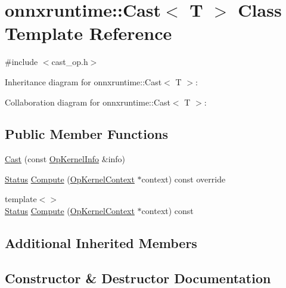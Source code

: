\hypertarget{classonnxruntime_1_1Cast}{}\section{onnxruntime\+:\+:Cast$<$ T $>$ Class Template Reference}
\label{classonnxruntime_1_1Cast}


{\ttfamily \#include $<$cast\+\_\+op.\+h$>$}



Inheritance diagram for onnxruntime\+:\+:Cast$<$ T $>$\+:


Collaboration diagram for onnxruntime\+:\+:Cast$<$ T $>$\+:
\subsection*{Public Member Functions}
\begin{DoxyCompactItemize}
\item 
\mbox{\hyperlink{classonnxruntime_1_1Cast_a47f2ac0d04a75fa194c39e4d3f8005bf}{Cast}} (const \mbox{\hyperlink{classonnxruntime_1_1OpKernelInfo}{Op\+Kernel\+Info}} \&info)
\item 
\mbox{\hyperlink{classonnxruntime_1_1common_1_1Status}{Status}} \mbox{\hyperlink{classonnxruntime_1_1Cast_ad1a2f4201ddd8dc51b8aebbb2b9fb5eb}{Compute}} (\mbox{\hyperlink{classonnxruntime_1_1OpKernelContext}{Op\+Kernel\+Context}} $\ast$context) const override
\item 
{\footnotesize template$<$$>$ }\\\mbox{\hyperlink{classonnxruntime_1_1common_1_1Status}{Status}} \mbox{\hyperlink{classonnxruntime_1_1Cast_a572f4254b2fbd63f83c27f15b8f99e50}{Compute}} (\mbox{\hyperlink{classonnxruntime_1_1OpKernelContext}{Op\+Kernel\+Context}} $\ast$context) const
\end{DoxyCompactItemize}
\subsection*{Additional Inherited Members}


\subsection{Constructor \& Destructor Documentation}
\mbox{\label{classonnxruntime_1_1Cast_a47f2ac0d04a75fa194c39e4d3f8005bf}} 
